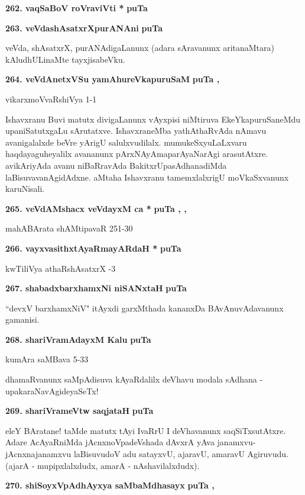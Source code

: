 \medskip
\noindent
\textbf{262. vaqSaBoV roVraviVti *} \hfill{\bf puTa \pageref{117}}

\eject

\noindent
\textbf{263. veVdashAsatxrXpurANAni} \hfill{\bf puTa \pageref{42b}}

\smallskip
veVda, shAsatxrX, purANAdigaLanunx (adara sAravanunx aritanaMtara) kAludhULi\-naMte tayxjisabeVku.

\medskip
\noindent
\textbf{264. veVdAnetxVSu yamAhureVkapuruSaM} \hfill{\bf puTa \pageref{232}, \pageref{243}}

\hfill{vikarxmoVvaRshiVya 1-1}

\smallskip
Ishavxranu Buvi matutx divigaLanunx vAyxpisi niMtiruva EkeYkapuruSaneMdu upaniSatutxgaLu sAru\-tatxve. IshavxraneMba yathAthaRvAda nAmavu avanigalalxde beVre yArigU salulxvudilalx. mumukeSx\-yuLaLx\-varu haqdayaguheyalilx avananunx pArxNAyAmaparAyaNarAgi arasutAtxre. avikAriyAda avanu niBaR\-ravAda BakitxrUpasAdhanadiMda laBisuvavanAgidAdxne. aMtaha Ishavxranu tamemxlalxrigU moVkaSxvanunx karuNisali.

\medskip
\noindent
\textbf{265. veVdAMshacx veVdayxM ca *} \hfill{\bf puTa \pageref{133}, \pageref{144}, \pageref{181}}

\hfill{mahABArata shAMtipavaR 251-30}

\medskip
\noindent
\textbf{266. vayxvasithxtAyaRmayARdaH *} \hfill{\bf puTa \pageref{90}}

\hfill{kwTiliVya athaRshAsatxrX -3}

\medskip
\noindent
\textbf{267. shabadxbarxhamxNi niSANxtaH} \hfill{\bf puTa \pageref{160}}

\smallskip
``devxV barxhamxNiV" itAyxdi garxMthada kananxDa BAvAnuvAdavanunx gamanisi.

\medskip
\noindent
\textbf{268. shariVramAdayxM Kalu} \hfill{\bf puTa \pageref{77}}

\hfill{kumAra saMBava 5-33}

\smallskip
dhamaRvanunx saMpAdisuva kAyaRdalilx deVhavu modala sAdhana - upakaraNavAgideyaSeTx!

\medskip
\noindent
\textbf{269. shariVrameVtw saqjataH} \hfill{\bf puTa \pageref{91}}

\smallskip
eleY BAratane! taMde matutx tAyi IvaRrU I deVhavanunx saqSiTxsutAtxre. Adare AcAyaRniMda jAcnxnoVpadeVshada dAvxrA yAva janamxvu-jAcnxnajanamxvu laBisuvudoV adu satayxvU, ajaravU, amaravU Agiruvudu. (ajarA - mupipxlalxdudx, amarA - nAshavilalxdudx).


\medskip
\noindent
\textbf{270. shiSoyxVpAdhAyxya saMbaMdhasayx} \hfill{\bf puTa \pageref{38}, \pageref{83}}

